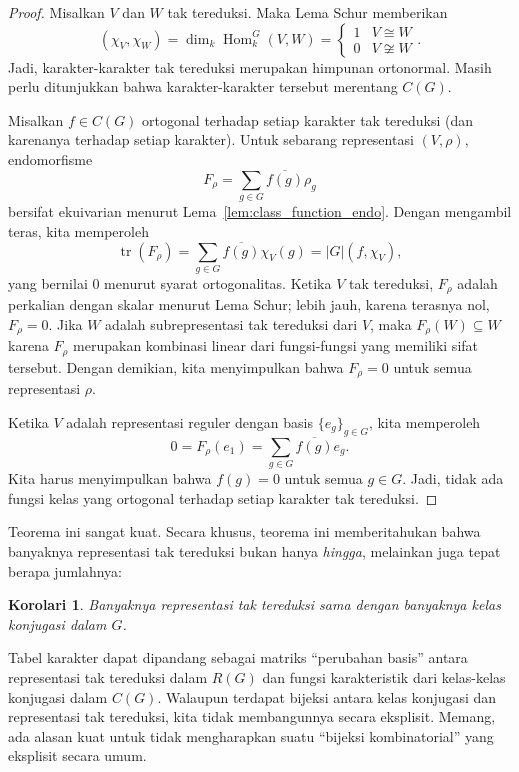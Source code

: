 \documentclass[12pt]{article}
\theoremstyle{plain}
\newtheorem{corollary}[theorem]{Korolari}
\theoremstyle{definition}
\theoremstyle{remark}
\numberwithin{equation}{section}
\begin{document}
\begin{proof}
Misalkan $V$ dan $W$ tak tereduksi.
Maka Lema Schur memberikan
\[
\left( \chi_V, \chi_W \right)
= \dim_k \operatorname{Hom}^G_k(V,W) =
\begin{cases}
1 & V \cong W\\
0 & V \not\cong W
\end{cases}.
\]
Jadi, karakter-karakter tak tereduksi merupakan himpunan ortonormal.
Masih perlu ditunjukkan bahwa karakter-karakter tersebut merentang $C(G)$.

Misalkan $f \in C(G)$ ortogonal terhadap setiap karakter tak tereduksi
(dan karenanya terhadap setiap karakter).
Untuk sebarang representasi $(V,\rho)$, endomorfisme
\[
F_\rho = \sum_{g \in G} \overline{f(g)} \rho_g
\]
bersifat ekuivarian menurut Lema~\ref{lem:class_function_endo}.
Dengan mengambil teras, kita memperoleh
\[
\operatorname{tr}(F_\rho) =
\sum_{g \in G} \overline{f(g)} \chi_V(g)
= |G| (f,\chi_V),
\]
yang bernilai $0$ menurut syarat ortogonalitas.
Ketika $V$ tak tereduksi,
$F_\rho$ adalah perkalian dengan skalar menurut Lema Schur;
lebih jauh, karena terasnya nol,
$F_\rho=0$.
Jika $W$ adalah subrepresentasi tak tereduksi dari $V$,
maka $F_\rho(W) \subseteq W$ karena $F_\rho$ merupakan kombinasi linear dari
fungsi-fungsi yang memiliki sifat tersebut.
Dengan demikian, kita menyimpulkan bahwa $F_\rho=0$ untuk semua representasi $\rho$.

Ketika $V$ adalah representasi reguler dengan basis $\{e_g\}_{g \in G}$,
kita memperoleh
\[
0=F_\rho(e_1)=\sum_{g \in G} \overline{f(g)} e_g .
\]
Kita harus menyimpulkan bahwa $f(g)=0$ untuk semua $g \in G$. Jadi, tidak ada fungsi kelas yang
ortogonal terhadap setiap karakter tak tereduksi.
\end{proof}

Teorema ini sangat kuat. Secara khusus, teorema ini memberitahukan bahwa
banyaknya representasi tak tereduksi bukan hanya \emph{hingga}, melainkan
juga tepat berapa jumlahnya:

\begin{corollary}
Banyaknya representasi tak tereduksi sama dengan banyaknya
kelas konjugasi dalam $G$.
\end{corollary}

Tabel karakter dapat dipandang sebagai matriks ``perubahan basis''
antara representasi tak tereduksi dalam $R(G)$ dan fungsi karakteristik
dari kelas-kelas konjugasi dalam $C(G)$.
Walaupun terdapat bijeksi antara kelas konjugasi
dan representasi tak tereduksi, kita tidak membangunnya secara eksplisit.
Memang, ada alasan kuat untuk tidak mengharapkan suatu ``bijeksi
kombinatorial'' yang eksplisit secara umum.
\end{document}
